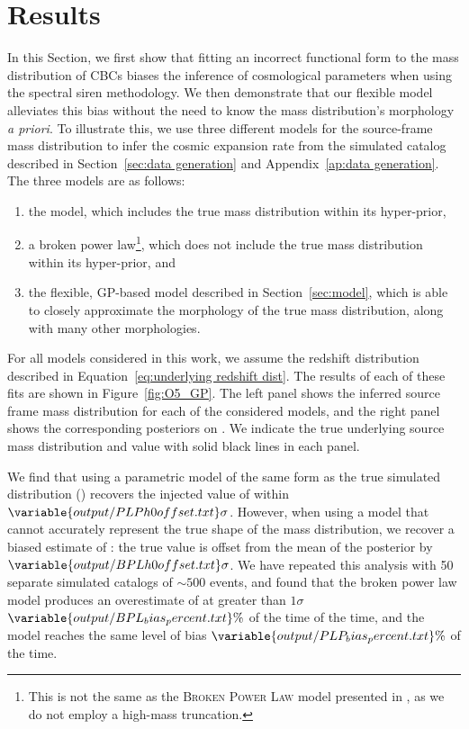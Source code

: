 \documentclass[preprint2,linenumbers]{aastex631}
\begin{document}
\section{Results}
\label{sec:results}
In this Section, we first show that fitting an incorrect functional form to the mass distribution of \acp{CBC} biases the inference of cosmological parameters when using the spectral siren methodology.
We then demonstrate that our flexible model alleviates this bias without the need to know the mass distribution's morphology \emph{a priori}.
To illustrate this, we use three different models for the source-frame mass distribution to infer the cosmic expansion rate from the simulated catalog described in Section~\ref{sec:data generation} and Appendix~\ref{ap:data generation}.
The three models are as follows:
\begin{enumerate}
    \item the \plp{} model, which includes the true mass distribution within its hyper-prior,
    \item a broken power law\footnote{This is not the same as the \textsc{Broken Power Law} model presented in \citet{abbott_population_2021}, as we do not employ a high-mass truncation.}, which does not include the true mass distribution within its hyper-prior, and 
    \item the flexible, \ac{GP}-based model described in Section~\ref{sec:model}, which is able to closely approximate the morphology of the true mass distribution, along with many other morphologies.
\end{enumerate}
For all models considered in this work, we assume the redshift distribution described in Equation~\ref{eq:underlying redshift dist}.
The results of each of these fits are shown in Figure~\ref{fig:O5_GP}. 
The left panel shows the inferred source frame mass distribution for each of the considered models, and the right panel shows the corresponding posteriors on \Ho{}. 
We indicate the true underlying source mass distribution and \Ho{} value with solid black lines in each panel. 

We find that using a parametric model of the same form as the true simulated distribution (\plp) recovers the injected value of \Ho{} within $\variable{output/PLPh0offset.txt}\sigma$.
However, when using a model that cannot accurately represent the true shape of the mass distribution, we recover a biased estimate of \Ho: the true value is offset from the mean of the posterior by $\variable{output/BPLh0offset.txt}\sigma$.
We have repeated this analysis with 50 separate simulated catalogs of $\sim500$ events, and found that the broken power law model produces an overestimate of \Ho{} at greater than $1\sigma$ $\variable{output/BPL_bias_percent.txt}\%$ of the time of the time, %
and the \plp{} model reaches the same level of bias $\variable{output/PLP_bias_percent.txt}\%$ 
of the time.
\end{document}
